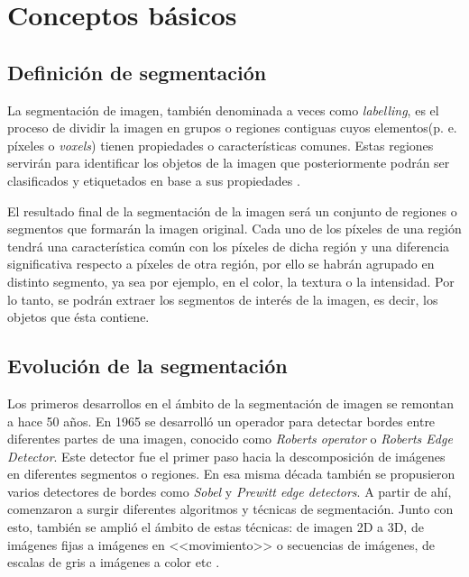 \chapter{Conceptos b\'{a}sicos}

\section{Definici\'{o}n de segmentaci\'{o}n}

La segmentaci\'{o}n de imagen, tambi\'{e}n denominada a veces como \textit{labelling}, es el proceso de dividir la imagen en grupos o regiones contiguas cuyos elementos(p. e. p\'{i}xeles o \textit{voxels}) tienen propiedades o caracter\'{i}sticas comunes. Estas regiones servir\'{a}n para identificar los objetos de la imagen que posteriormente podr\'{a}n ser clasificados y etiquetados en base a sus propiedades \cite{terry1}. 

El resultado final de la segmentaci\'{o}n de la imagen ser\'{a} un conjunto de regiones o segmentos que formar\'{a}n la imagen original. Cada uno de los p\'{i}xeles de una regi\'{o}n tendr\'{a} una caracter\'{i}stica com\'{u}n con los p\'{i}xeles de dicha regi\'{o}n y una diferencia significativa respecto a p\'{i}xeles de otra regi\'{o}n, por ello se habr\'{a}n agrupado en distinto segmento, ya sea por ejemplo, en el color, la textura o la intensidad. Por lo tanto, se podr\'{a}n extraer los segmentos de inter\'{e}s de la imagen, es decir, los objetos que \'{e}sta contiene.

\section{Evoluci\'{o}n de la segmentaci\'{o}n}\label{cap:EvoSeg}

Los primeros desarrollos en el \'{a}mbito de la segmentaci\'{o}n de imagen se remontan a hace 50 a\~{n}os. En 1965 se desarroll\'{o} un operador para detectar bordes entre diferentes partes de una imagen, conocido como \textit{Roberts operator} o \textit{Roberts Edge Detector}. Este detector fue el primer paso hacia la descomposici\'{o}n de im\'{a}genes en diferentes segmentos o regiones. En esa misma d\'{e}cada tambi\'{e}n se propusieron varios detectores de bordes como \textit{Sobel} y \textit{Prewitt edge detectors}. A partir de ah\'{i}, comenzaron a surgir diferentes algoritmos y t\'{e}cnicas de segmentaci\'{o}n. Junto con esto, tambi\'{e}n se ampli\'{o} el \'{a}mbito de estas t\'{e}cnicas: de imagen 2D a 3D, de im\'{a}genes fijas a im\'{a}genes en <<movimiento>> o secuencias de im\'{a}genes, de escalas de gris a im\'{a}genes a color etc \cite{zhang1}.


